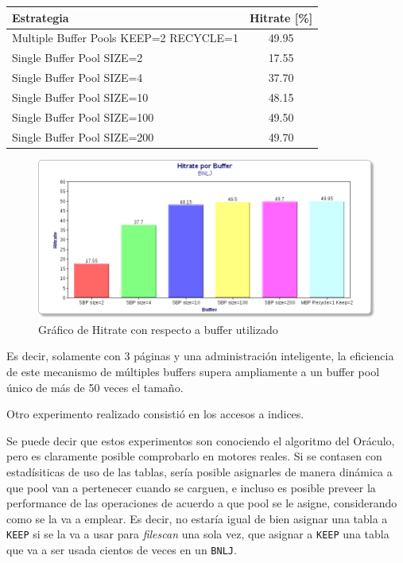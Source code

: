 \begin{table}[H]\centering
    \begin{tabular}{l || c}
    \large{\textbf{Estrategia}}                             & \large{\textbf{Hitrate}} [\%] \\
    \hline
    Multiple Buffer Pools KEEP=2 RECYCLE=1 & 49.95       \\
    Single Buffer Pool SIZE=2              & 17.55       \\
    Single Buffer Pool SIZE=4              & 37.70       \\
    Single Buffer Pool SIZE=10             & 48.15       \\
    Single Buffer Pool SIZE=100            & 49.50       \\
    Single Buffer Pool SIZE=200            & 49.70       \\
    \end{tabular}
\end{table}

\begin{figure}[H]\centering
    \includegraphics[scale=0.4]{BNLJ.png}
    \caption{Gráfico de Hitrate con respecto a buffer utilizado}
    \label{grafiquito}
\end{figure}


Es decir, solamente con 3 p\'aginas y una administraci\'on inteligente, la eficiencia
de este mecanismo de m\'ultiples buffers supera ampliamente a un buffer pool \'unico de
m\'as de 50 veces el tama\~no.

Otro experimento realizado consistió en los accesos a indices.

Se puede decir que estos experimentos son conociendo el algoritmo del Or\'aculo,
pero es claramente posible comprobarlo en motores reales. Si se contasen
con estadísiticas de uso de las tablas, sería posible asignarles de manera
din\'amica a que pool van a pertenecer cuando se carguen, e incluso es
posible preveer la performance de las operaciones de acuerdo a que pool
se le asigne, considerando como se la va a emplear. Es decir, no estaría
igual de bien asignar una tabla a \texttt{KEEP} si se la va a usar para \textit{filescan}
una sola vez, que asignar a \texttt{KEEP} una tabla que va a ser usada cientos de veces
en un \texttt{BNLJ}.
